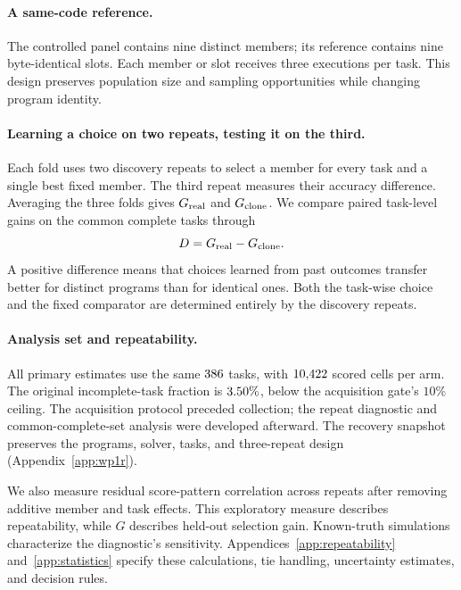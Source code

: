 \paragraph{A same-code reference.}
The controlled panel contains nine distinct members; its reference
contains nine byte-identical \bare{} slots. Each member or slot receives
three executions per task. This design preserves population size and
sampling opportunities while changing program identity.

\paragraph{Learning a choice on two repeats, testing it on the third.}
\label{sec:calibration-test}
Each fold uses two discovery repeats to select a member for every task
and a single best fixed member. The third repeat measures their accuracy
difference. Averaging the three folds gives $G_{\rm real}$ and
$G_{\rm clone}$. We compare paired task-level gains on the common
complete tasks through
\begin{equation}
D=G_{\rm real}-G_{\rm clone}.
\label{eq:clone-difference}
\end{equation}
A positive difference means that choices learned from past outcomes
transfer better for distinct programs than for identical ones.
Both the task-wise choice and the fixed comparator are determined
entirely by the discovery repeats.

\paragraph{Analysis set and repeatability.}
All primary estimates use the same $386$ tasks, with
$10{,}422$ scored cells per arm. The original incomplete-task fraction
is $3.50\%$, below the acquisition gate's $10\%$
ceiling. The acquisition protocol preceded collection; the repeat
diagnostic and common-complete-set analysis were developed afterward.
The recovery snapshot preserves the programs, solver, tasks, and
three-repeat design (Appendix~\ref{app:wp1r}).

We also measure residual score-pattern correlation across repeats
after removing additive member and task effects. This exploratory
measure describes repeatability, while $G$ describes held-out selection
gain. Known-truth simulations characterize the diagnostic's sensitivity.
Appendices~\ref{app:repeatability} and~\ref{app:statistics} specify these
calculations, tie handling, uncertainty estimates, and decision rules.
